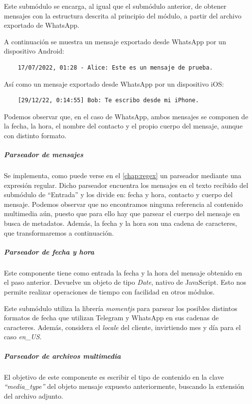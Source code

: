 Este submódulo se encarga, al igual que el submódulo anterior, de obtener mensajes con la estructura descrita al principio del módulo, a partir del archivo exportado de WhatsApp.

A continuación se muestra un mensaje exportado desde WhatsApp por un dispositivo Android:

\begin{lstlisting}
	17/07/2022, 01:28 - Alice: Este es un mensaje de prueba.
\end{lstlisting}

Así como un mensaje exportado desde WhatsApp por un dispositivo iOS:

\begin{lstlisting}
	[29/12/22, 0:14:55] Bob: Te escribo desde mi iPhone.
\end{lstlisting}

Podemos observar que, en el caso de WhatsApp, ambos mensajes se componen de la fecha, la hora, el nombre del contacto y el propio cuerpo del mensaje, aunque con distinto formato.

\subparagraph{Parseador de mensajes} Se implementa, como puede verse en el \autoref{chap:regex} un parseador mediante una expresión regular. Dicho parseador encuentra los mensajes en el texto recibido del submódulo de ``Entrada'' y los divide en: fecha y hora, contacto y cuerpo del mensaje. Podemos observar que no encontramos ninguna referencia al contenido multimedia aún, puesto que para ello hay que parsear el cuerpo del mensaje en busca de metadatos. Además, la fecha y la hora son una cadena de caracteres, que transformaremos a continuación.

\subparagraph{Parseador de fecha y hora} Este componente tiene como entrada la fecha y la hora del mensaje obtenido en el paso anterior. Devuelve un objeto de tipo \textit{Date}, nativo de JavaScript. Esto nos permite realizar operaciones de tiempo con facilidad en otros módulos.

Este submódulo utiliza la librería \textit{momentjs} para parsear los posibles distintos formatos de fecha que utilizan Telegram y WhatsApp en sus cadenas de caracteres. Además, considera el \textit{locale} del cliente, invirtiendo mes y día para el caso \textit{en\_US}.

\subparagraph{Parseador de archivos multimedia} El objetivo de este componente es escribir el tipo de contenido en la clave \textit{``media\_type''} del objeto mensaje expuesto anteriormente, buscando la extensión del archivo adjunto.

